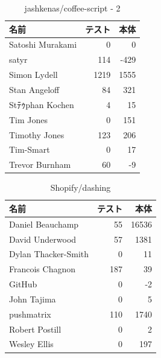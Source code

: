 \begin{table}[htb]
\begin{center}
\caption{jashkenas/coffee-script - 2}
\begin{tabular}{|l|r|r|} \hline 
名前 & テスト & 本体 \\ \hline \hline
Satoshi Murakami & 0 & 0\\ \hline
satyr & 114 & -429\\ \hline
Simon Lydell & 1219 & 1555\\ \hline
Stan Angeloff & 84 & 321\\ \hline
Stﾃｩphan Kochen & 4 & 15\\ \hline
Tim Jones & 0 & 151\\ \hline
Timothy Jones & 123 & 206\\ \hline
Tim-Smart & 0 & 17\\ \hline
Trevor Burnham & 60 & -9\\ \hline
\end{tabular}
\end{center}
\end{table}

\begin{table}[htb]
\begin{center}
\caption{Shopify/dashing}
\begin{tabular}{|l|r|r|} \hline 
名前 & テスト & 本体 \\ \hline \hline
Daniel Beauchamp & 55 & 16536\\ \hline
David Underwood & 57 & 1381\\ \hline
Dylan Thacker-Smith & 0 & 11\\ \hline
Francois Chagnon & 187 & 39\\ \hline
GitHub & 0 & -2\\ \hline
John Tajima & 0 & 5\\ \hline
pushmatrix & 110 & 1740\\ \hline
Robert Postill & 0 & 2\\ \hline
Wesley Ellis & 0 & 197\\ \hline
\end{tabular}
\end{center}
\end{table}

